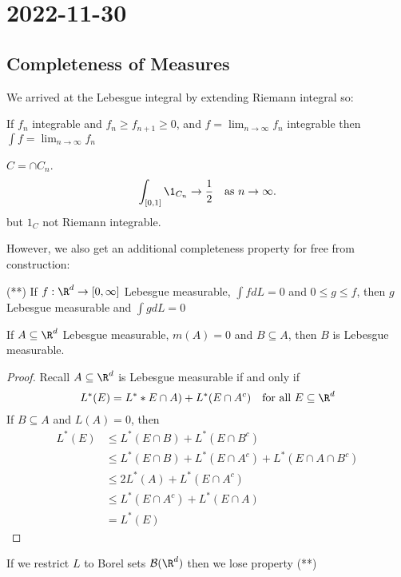 \section{2022-11-30}

\subsection{Completeness of Measures}

We arrived at the Lebesgue integral by extending Riemann integral so:

If $f_n$ integrable and $f_n \geq f_{n+1} \geq 0$, and $f = \lim_{n\to \infty} f_n$ integrable then $\int f = \lim_{n \to \infty} f_n$

\begin{example}
	$C = \cap C_n$.
	 \[
		 \int_{[0,1]} \1_{C_n} \to \frac{1}{2} \quad \text{as } n \to \infty.
	\]
	but $1_{C}$ not Riemann integrable.
\end{example}

However, we also get an additional completeness property for free from construction:


(**) If $f : \R^d \to [0,\infty]$ Lebesgue measurable, $\int f dL = 0$ and $0 \leq g \leq f$, then $g$ Lebesgue measurable and $\int g dL = 0$


 \begin{lemma}
	If $A \subseteq \R^d$ Lebesgue measurable, $m(A) = 0$ and $B \subseteq  A$, then $B$ is Lebesgue measurable.
\end{lemma}

\begin{proof}
	Recall $A \subseteq \R^d$ is Lebesgue measurable if and only if
	\[
		L^*(E) = L^**E \cap A) + L^* (E \cap A^c) \quad \text{for all } E \subseteq \R^d
	\]
	If $B \subseteq A$ and $L(A) = 0$, then 
	\begin{align*}
		L^*(E) &\leq L^*(E \cap B) + L^*(E \cap B^c) \\
			   &\leq L^*(E \cap B) + L^*(E \cap A^c) + L^*(E \cap A \cap B^c) \\
			   &\leq 2 L^*(A) + L^*(E \cap A^c) \\
			   &\leq L^*(E \cap A^c) + L^*(E \cap A) \\
			   &= L^*(E)
	\end{align*} 
\end{proof}

\begin{remark}
	If we restrict $L$ to Borel sets $\B(\R^d)$ then we lose property (**)
\end{remark}

